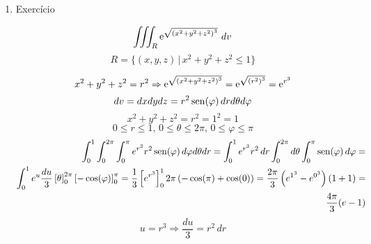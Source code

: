\begin{enumerate}
	\item Exercício
	
	\begin{equation*}
		\iiint_R \operatorname{e}^{\sqrt{\left(x^2 + y^2 + z^2\right)^3}}\, dv
	\end{equation*}
	\begin{equation*}
		R = \{(x,y,z) \,|\, x^2 + y^2 + z^2 \leq 1\}
	\end{equation*}
	
	\begin{equation*}
		x^2 + y^2 + z^2 = r^2 \Rightarrow \operatorname{e}^{\sqrt{\left(x^2 + y^2 + z^2\right)^3}} = \operatorname{e}^{\sqrt{\left(r^2\right)^3}} = \operatorname{e}^{r^3}
	\end{equation*}
	\begin{equation*}
		dv = dxdydz = r^2\operatorname{sen}(\varphi)\, dr d\theta d\varphi
	\end{equation*}
	\begin{equation*}
		x^2 + y^2 + z^2 = r^2 = 1^2 = 1
	\end{equation*}
	\begin{equation*}
		0 \leq r \leq 1,\, 0 \leq \theta \leq 2\pi,\, 0 \leq \varphi \leq \pi
	\end{equation*}
	\begin{align*}
		\int_0^1 \int_0^{2\pi} \int_0^{\pi} e^{r^3} r^2\operatorname{sen}(\varphi)\, d\varphi d\theta dr = \int_0^1 e^{r^3} r^2\,dr \int_0^{2\pi} d\theta \int_0^{\pi} \operatorname{sen}(\varphi)\, d\varphi =\\ \int_0^1 e^u \dfrac{du}{3} \left[\theta\right]_0^{2\pi} \left[-\cos(\varphi)\right]_0^{\pi} = \dfrac{1}{3} \left[e^{r^3}\right]_0^1 2\pi \left(-\cos(\pi) + \cos(0)\right) = \dfrac{2\pi}{3} \left(e^{1^3} - e^{0^3}\right)(1+1) =\\ \dfrac{4\pi}{3} (e - 1)
	\end{align*}
	\begin{equation*}
		u = r^3 \Rightarrow \dfrac{du}{3} = r^2\, dr
	\end{equation*}
\end{enumerate}